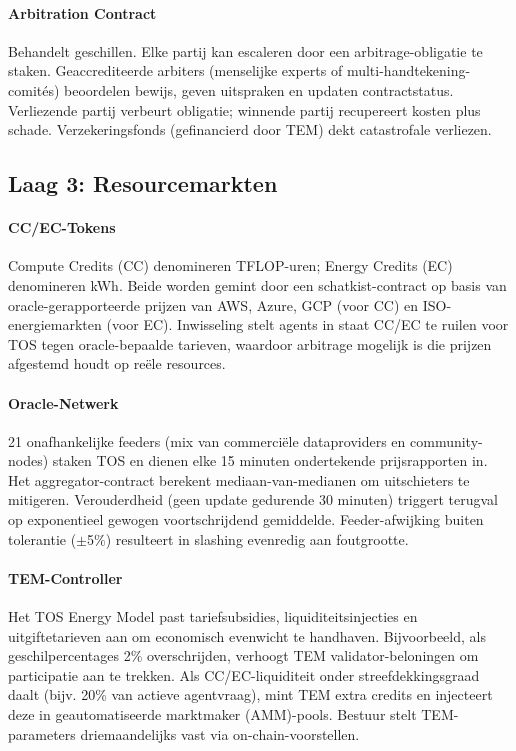 \documentclass[11pt]{article}
\begin{document}
\paragraph{Arbitration Contract} Behandelt geschillen. Elke partij kan escaleren door een arbitrage-obligatie te staken. Geaccrediteerde arbiters (menselijke experts of multi-handtekening-comités) beoordelen bewijs, geven uitspraken en updaten contractstatus. Verliezende partij verbeurt obligatie; winnende partij recupereert kosten plus schade. Verzekeringsfonds (gefinancierd door TEM) dekt catastrofale verliezen.

\subsection{Laag 3: Resourcemarkten}
\paragraph{CC/EC-Tokens} Compute Credits (CC) denomineren TFLOP-uren; Energy Credits (EC) denomineren kWh. Beide worden gemint door een schatkist-contract op basis van oracle-gerapporteerde prijzen van AWS, Azure, GCP (voor CC) en ISO-energiemarkten (voor EC). Inwisseling stelt agents in staat CC/EC te ruilen voor TOS tegen oracle-bepaalde tarieven, waardoor arbitrage mogelijk is die prijzen afgestemd houdt op reële resources.

\paragraph{Oracle-Netwerk} 21 onafhankelijke feeders (mix van commerciële dataproviders en community-nodes) staken TOS en dienen elke 15 minuten ondertekende prijsrapporten in. Het aggregator-contract berekent mediaan-van-medianen om uitschieters te mitigeren. Verouderdheid (geen update gedurende 30 minuten) triggert terugval op exponentieel gewogen voortschrijdend gemiddelde. Feeder-afwijking buiten tolerantie ($\pm$5\%) resulteert in slashing evenredig aan foutgrootte.

\paragraph{TEM-Controller} Het TOS Energy Model past tariefsubsidies, liquiditeitsinjecties en uitgiftetarieven aan om economisch evenwicht te handhaven. Bijvoorbeeld, als geschilpercentages 2\% overschrijden, verhoogt TEM validator-beloningen om participatie aan te trekken. Als CC/EC-liquiditeit onder streefdekkingsgraad daalt (bijv. 20\% van actieve agentvraag), mint TEM extra credits en injecteert deze in geautomatiseerde marktmaker (AMM)-pools. Bestuur stelt TEM-parameters driemaandelijks vast via on-chain-voorstellen.
\end{document}
